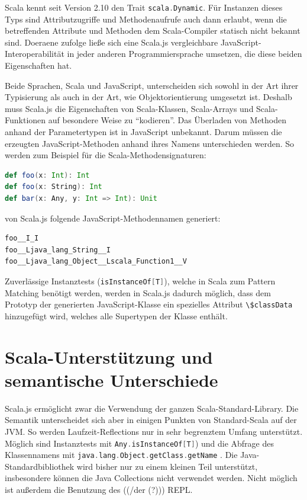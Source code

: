 \documentclass[a4paper, 12pt, hidelinks, listof=totoc, listoftables=totoc, bibliography=totoc]{scrreprt}
\newcommand{\code}[1]{\lstinline[language=Scala, style=inline]|#1|}
\newcommand{\scala}[1]{\lstinline[language=Scala, style=inline]|#1|}
\begin{document}
Scala kennt seit Version 2.10 den Trait \scala{scala.Dynamic}. Für Instanzen dieses Typs sind Attributzugriffe und Methodenaufrufe auch dann erlaubt, wenn die betreffenden Attribute und Methoden dem Scala-Compiler statisch nicht bekannt sind. Doeraene zufolge ließe sich eine Scala.js vergleichbare JavaScript-Interoperabilität in jeder anderen Programmiersprache umsetzen, die diese beiden Eigenschaften hat.\cite[S. 3]{doeraene2013.TDI}

Beide Sprachen, Scala und JavaScript, unterscheiden sich sowohl in der Art ihrer Typisierung als auch in der Art, wie Objektorientierung umgesetzt ist. Deshalb muss Scala.js die Eigenschaften von Scala-Klassen, Scala-Arrays und Scala-Funktionen auf besondere Weise zu "`kodieren"'. Das Überladen von Methoden anhand der Parametertypen ist in JavaScript unbekannt. Darum müssen die erzeugten JavaScript-Methoden anhand ihres Namens unterschieden werden. So werden zum Beispiel für die Scala-Methodensignaturen:

\begin{lstlisting}[language=Scala, style=snippet]
def foo(x: Int): Int
def foo(x: String): Int
def bar(x: Any, y: Int => Int): Unit
\end{lstlisting}

von Scala.js folgende JavaScript-Methodennamen generiert:

\begin{lstlisting}[language=JavaScript, style=snippet]
foo__I_I
foo__Ljava_lang_String__I
foo__Ljava_lang_Object__Lscala_Function1__V
\end{lstlisting}

Zuverlässige Instanztests (\scala{isInstanceOf[T]}), welche in Scala zum Pattern Matching benötigt werden, werden in Scala.js dadurch möglich, dass dem Prototyp der generierten JavaScript-Klasse ein spezielles Attribut \code{\$classData} 
hinzugefügt wird, welches alle Supertypen der Klasse enthält. \cite[Vgl.][S. 3 f.]{doeraene2013.TDI}



\section{Scala-Unterstützung und semantische Unterschiede}

Scala.js ermöglicht zwar die Verwendung der ganzen Scala-Standard-Library. Die Semantik unterscheidet sich aber in einigen Punkten von Standard-Scala auf der JVM. So werden Laufzeit-Reflections nur in sehr begrenztem Umfang unterstützt. Möglich sind Instanztests mit \scala{Any.isInstanceOf[T]}) \cite[S. 2 f.]{doeraene2013.TDI} und die Abfrage des Klassennamens mit \scala{java.lang.Object.getClass.getName} \cite{scalajs.DSS}. Die Java-Standardbibliothek wird bisher nur zu einem kleinen Teil unterstützt\cite{doeraene2014.WHB}, insbesondere können die Java Collections nicht verwendet werden. Nicht möglich ist außerdem die Benutzung des ((/der (?))) REPL\cite{doeraene2013.CSJ}.
\end{document}
